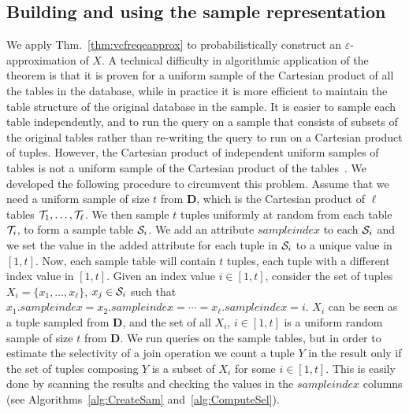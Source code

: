 \subsection{Building and using the sample representation}\label{sec:building}
We apply Thm.~\ref{thm:vcfreqeapprox} to probabilistically construct an $\varepsilon$-approximation of $X$.
A technical difficulty in algorithmic application of the theorem is that it is proven  for
a uniform sample of the Cartesian product
of all the tables in the database, while
in practice it is more efficient to maintain the table structure of the
original database in the sample. It is easier to sample each table
independently, and to run the query on a sample that consists of subsets of the
original tables rather than re-writing the query to run on a Cartesian product
of tuples. However, the Cartesian product of independent uniform samples of
tables is not a uniform sample of the Cartesian product of the
tables~\citep{ChaudhuriMN99}. We developed the following procedure to circumvent
this problem. Assume that we need a uniform sample of size $t$ from
$\mathbf{D}$, which is the Cartesian product of $\ell$ tables
${\cal T}_1,\dotsc,{\cal T}_\ell$. We then sample $t$ tuples uniformly at random from
each table ${\cal T}_i$, to form a sample table ${\cal S}_i$. We add an attribute
$sampleindex$ to each ${\cal S}_i$ and we set the value in the added attribute for each tuple in
${\cal S}_i$ to a unique value in $[1,t]$. Now, each sample table will contain $t$ tuples,
each tuple with a different index value in $[1,t]$. Given an index value
$i\in[1,t]$, consider the set of tuples $X_i=\{x_1,\dotsc,x_\ell\}$, $x_j\in{\cal S}_i$
such that $x_1.sampleindex = x_2.sampleindex =\dotsb=x_\ell.sampleindex=i$. $X_i$
can be seen as a tuple sampled from $\mathbf{D}$, and the set of all $X_i$,
$i\in[1,t]$ is a uniform random sample of size $t$ from $\mathbf{D}$. We run
queries on the sample tables, but in order to estimate the selectivity of a join
operation we count a tuple $Y$ in the result only if the set of tuples composing
$Y$ is a subset of $X_i$ for some $i\in[1,t]$. This is easily done by scanning
the results and checking the values in the $sampleindex$ columns (see Algorithms~\ref{alg:CreateSam} and~\ref{alg:ComputeSel}).

\begin{algorithm}[ht]
\DontPrintSemicolon
{}
\caption{$\mathtt{CreateSample}(s,(T_1,\dots,T_k))$}\label{alg:CreateSam}
\end{algorithm}

